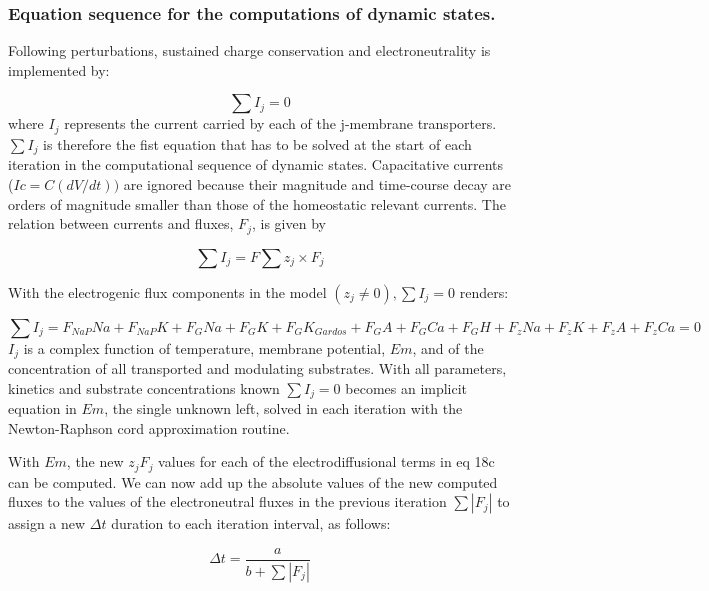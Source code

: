 \documentclass[a4paper]{article}
\newcommand{\F}[2]{F_{#1}#2}
\begin{document}
\subsubsection{Equation sequence for the computations of dynamic states.}
Following perturbations, sustained charge conservation and electroneutrality is implemented by:

\setcounter{equation}{0}
\renewcommand{\theequation}{18\alph{equation}}

\begin{equation}
\sum I_j = 0 
\end{equation}
where $I_j$ represents the current carried by each of the j-membrane transporters. $\sum I_j$ is therefore the fist equation that has to be solved at the start of each iteration in the computational sequence of dynamic states. Capacitative currents ($Ic = C(dV/dt))$ are ignored because their magnitude and time-course decay are orders of magnitude smaller than those of the homeostatic relevant currents.  The relation between currents and fluxes, $F_j$, is given by 

\begin{equation}
\sum I_j = F\sum z_j\times F_j
\end{equation}

With the electrogenic flux components in the model $(z_j\neq 0), \sum I_j = 0$ renders:

\begin{equation}
\sum I_j = \F{NaP}{Na} + \F{NaP}{K} + \F{G}{Na} + \F{G}{K} + \F{G}{K_{Gardos}} + \F{G}{A} + \F{G}{Ca} + \F{G}{H} + \F{z}{Na} + \F{z}{K} + \F{z}{A} + \F{z}{Ca} = 0
\end{equation}
$I_j$ is a complex function of temperature, membrane potential, $Em$, and of the concentration of all transported and modulating substrates.  With all parameters, kinetics and substrate concentrations known $\sum I_j = 0$ becomes an implicit equation in $Em$, the single unknown left, solved in each iteration with the Newton-Raphson cord approximation routine.      

With $Em$, the new $z_jF_j$ values for each of the electrodiffusional terms in eq 18c can be computed.  We can now add up the absolute values of the new computed fluxes to the values of the electroneutral fluxes in the previous iteration $\sum |F_j|$ to assign a new $\Delta t$ duration to each iteration interval, as follows:  

\setcounter{equation}{18}
\renewcommand{\theequation}{\arabic{equation}}
\begin{equation}
\Delta t = \frac{a}{b + \sum|F_j|}
\end{equation}
\end{document}
